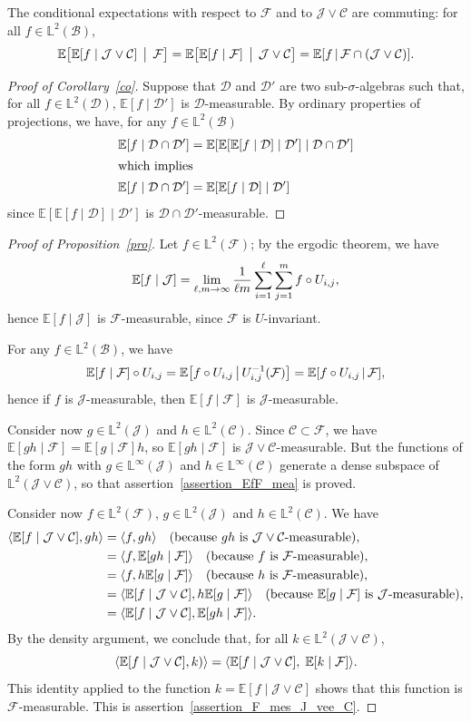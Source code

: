 \documentclass[AHL,Unicode,longabstracts,published]{cedram}
\newcommand*\bbL{\mathbb{L}}
\newcommand{\bbE}{\mathbb{E}}
\newcommand{\E}[1]{\bbE\left[#1\right]}
\newcommand*\J{\mathcal{J}}
\newcommand*\C{\mathcal{C}}
\newcommand*\B{\mathcal{B}}
\newcommand*\D{\mathcal{D}}
\newcommand*\F{\mathcal{F}}
\renewcommand*{\to}{\mathchoice{\longrightarrow}{\rightarrow}{\rightarrow}{\rightarrow}}
\let\originalleft\left
\let\originalright\right
\renewcommand{\left}{\mathopen{}\mathclose\bgroup\originalleft}
\renewcommand{\right}{\aftergroup\egroup\originalright}
\begin{document}
\begin{coro}\label{co}
The conditional expectations with respect to $\F$ and to $\J\vee\C$ are commuting: for all $f\in \bbL^2(\B)$,
\[
\bbE\bigl[\E{f\mid\J\vee\C}\,\bigm|\,\F\bigr]=\bbE\bigl[\E{f\mid\F}\,\bigm|\,\J\vee\C\bigr]=\E{f\,\middle|\,\F\cap(\J\vee\C)}.
\]
\end{coro}


\begin{proof}[Proof of Corollary~\ref{co}]
Suppose that $\D$ and $\D'$ are two sub-$\sigma$-algebras such that, for all $f\in \bbL^2(\D)$, $\bbE[f\mid\D']$ is $\D$-measurable. By ordinary properties of projections, we have, for any $f\in \bbL^2(\B)$
\begin{align*}
\E{f\mid\D\cap\D'} &=\E{\E{\E{f\mid\D}\mid\D'}\mid\D\cap\D'}
\\
\intertext{which implies}
\E{f\mid\D\cap\D'} &=\E{\E{f\mid\D}\mid\D'}
\end{align*}
since $\bbE[\bbE[f\mid\D]\mid\D']$ is $\D\cap\D'$-measurable.
\end{proof}


\begin{proof}[Proof of Proposition~\ref{pro}]
Let $f\in \bbL^2(\F)$; by the ergodic theorem, we have
\[
\E{f\mid\J}=\lim_{\ell,m\to\infty}\frac1{\ell m}\sum_{i=1}^\ell \sum_{j=1}^mf\circ U_{i,j},
\]
hence $\bbE[f\mid\J]$ is $\F$-measurable, since $\F$ is $U$-invariant.

For any $f\in \bbL^2(\B)$, we have
\[
\E{f\mid\F}\circ U_{i,j}=\E{f\circ U_{i,j}\,\middle|\, U_{i,j}^{-1}(\F)}=\E{f\circ U_{i,j}\,\middle|\,\F},
\]
hence if $f$ is $\J$-measurable, then $\bbE[f\mid\F]$ is $\J$-measurable.

Consider now $g\in \bbL^2(\J)$ and $h\in \bbL^2(\C)$. Since $\C\subset \F$, we have $
\bbE[gh\mid\F]=\bbE[g\mid\F] h $, so $\bbE[gh\mid\F]$ is $\J\vee\C$-measurable. But the functions of the form $gh$ with $g\in \bbL^\infty(\J)$ and $h\in \bbL^\infty(\C)$ generate a dense subspace of $ \bbL^2(\J\vee\C)$, so that assertion~\eqref{assertion_EfF_mea} is proved.

Consider now $f\in \bbL^2(\F)$, $g\in \bbL^2(\J)$ and $h\in \bbL^2(\C)$. We have
\begin{align*}
\left\langle \E{f\mid\J\vee\C},gh\right\rangle &=\langle f,gh\rangle\quad\text{(because $gh$ is $\J\vee\C$-measurable)},\\
&=\langle f,\E{gh\mid\F}\rangle\quad\text{(because $f$ is $\F$-measurable)},\\
&=\langle f,h\E{g\mid\F}\rangle\quad\text{(because $h$ is $\F$-measurable)},\\
&=\langle \E{f\mid\J\vee\C},h\E{g\mid\F}\rangle \quad\text{(because $\E{g\mid\F}$ is $\J$-measurable)},\\
&=\langle \E{f\mid\J\vee\C},\E{gh\mid\F}\rangle.
\end{align*}
By the density argument, we conclude that, for all $k\in \bbL^2(\J\vee\C)$,
\[
\langle \E{f\mid\J\vee\C},k)\rangle=\langle \E{f\mid\J\vee\C},\;\E{k\mid\F}\rangle.
\]
This identity applied to the function $k= \bbE[f\mid\J\vee\C]$ shows that this function is $\F$-measurable. This is assertion~\eqref{assertion_F_mes_J_vee_C}.
\end{proof}
\end{document}
